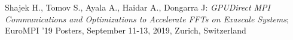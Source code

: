 
		Shajek H., Tomov S., Ayala A., Haidar A., Dongarra J: {\sl GPUDirect MPI Communications and Optimizations to Accelerate FFTs on Exascale Systems};
		EuroMPI ’19 Posters, September 11-13, 2019, Zurich, Switzerland
